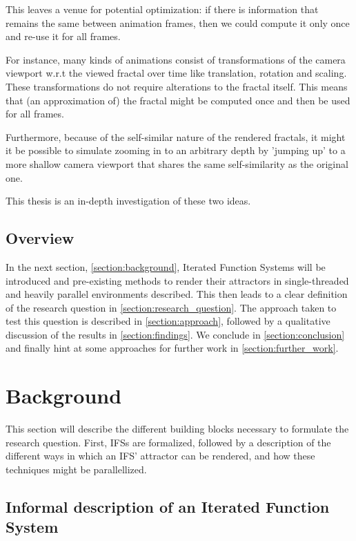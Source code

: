 \documentclass[11pt]{article}
\begin{document}
This leaves a venue for potential optimization: if there is information that remains the same between animation frames, 
then we could compute it only once and re-use it for all frames.

For instance, many kinds of animations consist of transformations of the camera viewport w.r.t the viewed fractal over time like translation, rotation and scaling. 
These transformations do not require alterations to the fractal itself.
This means that (an approximation of) the fractal might be computed once and then be used for all frames.

Furthermore, because of the self-similar nature of the rendered fractals,
it might it be possible to simulate zooming in to an arbitrary depth by 'jumping up' to a more shallow camera viewport
that shares the same self-similarity as the original one.

This thesis is an in-depth investigation of these two ideas.

\subsection{Overview}
\label{sec:org6879d8e}

In the next section, \autoref{section:background}, Iterated Function Systems will be introduced and pre-existing methods to render their attractors in single-threaded and heavily parallel environments described.
This then leads to a clear definition of the research question in \autoref{section:research_question}.
The approach taken to test this question is described in \autoref{section:approach}, followed by a qualitative discussion of the results in \autoref{section:findings}.
We conclude in \autoref{section:conclusion} and finally hint at some approaches for further work in \autoref{section:further_work}.

\section{Background}
\label{sec:org4991c46}
\label{section:background}

This section will describe the different building blocks necessary to formulate the research question.
First, IFSs are formalized, followed by a description of the different ways in which an IFS' attractor can be rendered, 
and how these techniques might be parallellized.

\subsection{Informal description of an Iterated Function System}
\label{sec:org914d586}
\label{subsection:informal_description}
\end{document}
